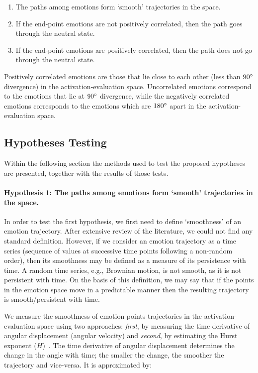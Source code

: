 \documentclass[10pt,journal,cspaper,compsoc]{IEEEtran}
\begin{document}
\begin{enumerate}
\item The paths among emotions form `smooth' trajectories in the space.
\item If the end-point emotions are not positively correlated, then the path goes through the neutral state.
\item If the end-point emotions are positively correlated, then the path does not go through the neutral state.
\end{enumerate}

Positively correlated emotions are those that lie close to each other (less than $90\degree$ divergence) in the activation-evaluation space. Uncorrelated emotions correspond to the emotions that lie at $90\degree$ divergence, while the negatively correlated emotions corresponds to the emotions which are $180\degree$ apart in the activation-evaluation space. 

\subsection{Hypotheses Testing}
\label{sec_hypotheses_testing}

Within the following section the methods used to test the proposed hypotheses are presented, together with the results of those tests.

\paragraph*{Hypothesis 1: The paths among emotions form `smooth' trajectories in the space.}
\label{para_hypothesis_1}

In order to test the first hypothesis,  we first need to define `smoothness' of an emotion trajectory. After extensive review of the literature, we could not find any standard definition. However, if we consider an emotion trajectory as a time series (sequence of values at successive time points following a non-random order), then its smoothness may be defined as a measure of its persistence with time. A random time series, e.g., Brownian motion, is not smooth, as it is not persistent with time. On the basis of this definition, we may say that if the points in the emotion space move in a predictable manner then the resulting trajectory is smooth/persistent with time.

We measure the smoothness of emotion points trajectories in the activation-evaluation space using two approaches: \emph{first}, by measuring the time derivative of angular displacement (angular velocity) and \emph{second}, by estimating the Hurst exponent ($H$)~\cite{qian2004hurst}. The time derivative of angular displacement determines the change in the angle with time; the smaller the change, the smoother the trajectory and vice-versa. It is approximated by:
\end{document}
